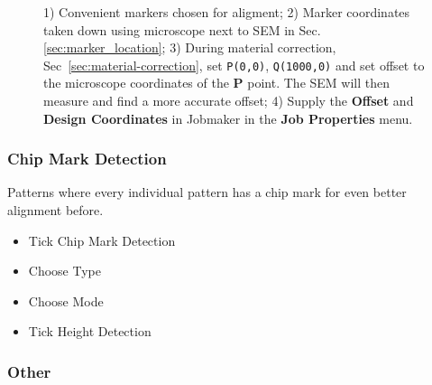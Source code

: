 \begin{figure}[h]
  \centering {}
  \caption{\small  1)   Convenient  markers  chosen  for   aligment;  2)  Marker
    coordinates    taken    down   using    microscope    next    to   SEM    in
    Sec.\ref{sec:marker_location};     3)     During    material     correction,
    Sec~\ref{sec:material-correction},  set \texttt{P(0,0)},  \texttt{Q(1000,0)}
    and set  offset to the microscope  coordinates of the \textbf{P}  point. The
    SEM  will then  measure  and find  a  more accurate  offset;  4) Supply  the
    \textbf{Offset}  and   \textbf{Design  Coordinates}   in  Jobmaker   in  the
    \textbf{Job Properties} menu.}
  \label{fig:pq_coordinates}
\end{figure}

\subsubsection{Chip Mark Detection}
\label{sec:chip-mark-detection}

\begin{framed}\noindent
  Patterns  where every  individual  pattern has  a chip  mark  for even  better
  alignment before.
\end{framed}

\begin{itemize}
\item Tick Chip Mark Detection
\item Choose Type
\item Choose Mode
\item Tick Height Detection
\end{itemize}

\subsubsection{Other}
\label{sec:other}


